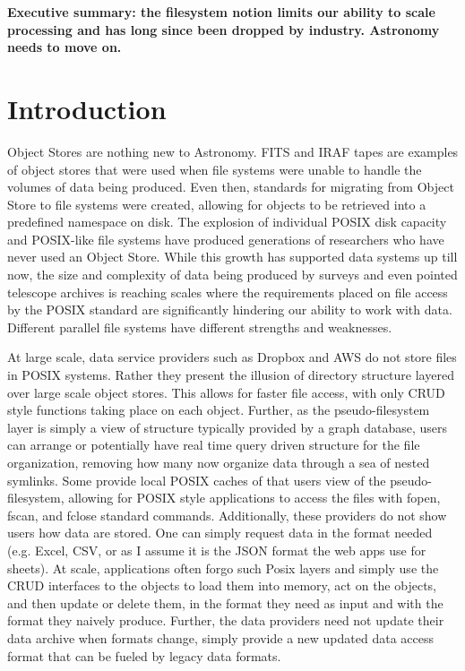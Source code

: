 {\bf Executive summary: the filesystem notion limits our ability to scale processing and has long since been dropped by industry. Astronomy needs to move on.}
\section{Introduction} \label{sec:intro}

Object Stores are nothing new to Astronomy.  \gls{FITS} and \gls{IRAF} tapes are examples
of object stores that were used when file systems were unable to handle the volumes
of data being produced. Even then, standards for migrating from \gls{Object} Store to file
systems were created, allowing for objects to be retrieved into a predefined namespace
on disk.  The explosion of individual \gls{POSIX} disk capacity and \gls{POSIX}-like file systems
have produced generations of researchers who have never used an \gls{Object} Store. While
this growth has supported data systems up till now, the size and complexity of
data being produced by surveys and even pointed telescope archives is reaching
scales where the requirements placed on file access by the \gls{POSIX} standard are
significantly hindering our ability to work with data.  Different parallel file systems
have different strengths and weaknesses.

At large scale, data service providers such as Dropbox and \gls{AWS} do not store files
in \gls{POSIX} systems.  Rather they present the illusion of directory structure layered over
large scale object stores. This allows for faster file access, with only \gls{CRUD} style
functions taking place on each object.  Further, as the pseudo-filesystem layer is simply a
view of structure typically provided by a graph database, users can arrange or potentially
have real time query driven structure for the file organization, removing how many now
organize data through a sea of nested symlinks.
Some provide local \gls{POSIX} caches of that users view of the
pseudo-filesystem, allowing for \gls{POSIX} style applications to access the files with
fopen, fscan, and fclose standard commands. Additionally, these providers do
not show users how data are stored. One can simply request data in the format
needed (e.g. Excel, \gls{CSV}, or as I assume it is the \gls{JSON} format the web apps
use for sheets).   At scale, applications often forgo
such Posix layers and simply use the \gls{CRUD} interfaces to the objects to load them into
memory, act on the objects, and then update or delete them, in the format they need
as input and with the format they naively produce. Further, the data providers need
not update their data archive when formats change, simply provide a new updated
data access format that can be fueled by legacy data formats.

